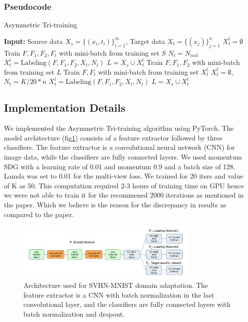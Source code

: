 \documentclass{article}
\begin{document}
\subsubsection*{Pseudocode}
\begin{algorithm}[H]
\caption{Asymmetric Tri-training}
\begin{algorithmic}[1]
\STATE \textbf{Input:} Source data $X_s = \{(x_i, t_i)\}_{i=1}^m$, Target data $X_t = \{(x_j)\}_{j=1}^n$
\STATE $X_t^l = \emptyset$ 
  \STATE Train $F, F_1, F_2, F_t$ with mini-batch from training set $S$
\ENDFOR
\STATE $N_t = N_{init}$
\STATE $X_t^l = \text{Labeling}(F, F_1, F_2, X_t, N_t)$
\STATE $L = X_s \cup X_t^l$
    \STATE Train $F, F_1, F_2$ with mini-batch from training set $L$
    \STATE Train $F, F_t$ with mini-batch from training set $X_t^l$
  \ENDFOR
  \STATE $X_t^l = \emptyset$, $N_t = K/20 * n$
  \STATE $X_t^l = \text{Labeling}(F, F_1, F_2, X_t, N_t)$
  \STATE $L = X_s \cup X_t^l$
\ENDFOR
\end{algorithmic}
\end{algorithm}

\subsection*{Implementation Details}
We implemented the Asymmetric Tri-training algorithm using PyTorch. The model architecture (fig\ref{fig:att_implementation}) consists of a feature extractor followed by three classifiers. The feature extractor is a convolutional neural network (CNN) for image data, while the classifiers are fully connected layers. We used momentum SDG with a learning rate of 0.01 and momentum 0.9 and a batch size of 128. Lamda was set to 0.01 for the multi-view loss. We trained for 20 iters and value of K as 50. This computation required 2-3 hours of training time on GPU hence we were not able to train it for the recommened 2000 iterations as mentioned in the paper. Which we believe is the reason for the discrepancy in results as compared to the paper.
\begin{figure}[h]
  \centering
  \includegraphics[width=0.8\textwidth]{ATT/Imp_acc.png}
  \caption{Architecture used for SVHN-MNIST domain adaptation. The feature extractor is a CNN with batch normalization in the last convolutional layer, and the classifiers are fully connected layers with batch normalization and dropout.}
  \label{fig:att_implementation}
\end{figure}
\end{document}
